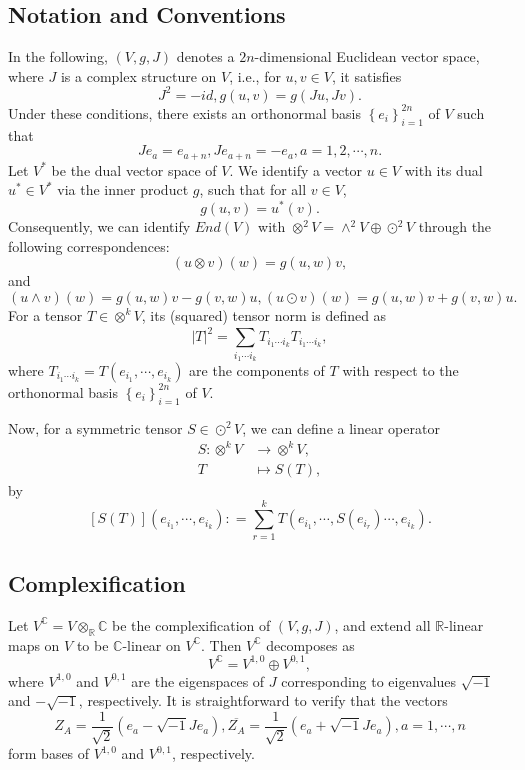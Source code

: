 \documentclass{amsart}
\theoremstyle{definition}
\theoremstyle{remark}
\numberwithin{equation}{section}
\begin{document}
\subsection{Notation and Conventions}
 In the following, $\left( V,g,J \right)$ denotes a $2n$-dimensional Euclidean vector space, where $J$ is a complex structure on $V$, i.e., for $u,v \in V$, it satisfies
$$J^2=-id,g\left( {u,v} \right) = g\left( {Ju,Jv} \right).$$
Under these conditions, there  exists an orthonormal basis $\left\{ {{e_i}} \right\}_{i = 1}^{2n}$ of $V$ such that
\begin{equation}
\label{equation2.1}
J{e_a} = {e_{a + n}},J{e_{a + n}} =  - {e_a},a = 1,2, \cdots ,n.
\end{equation}
Let $V^*$ be the dual vector space of $V$. We identify a vector $u\in V$ with its dual $u^* \in V^*$ via the inner product $g$, such that for all $v\in V$,
$$g\left( {u,v} \right)={u^*}\left( {v} \right).$$
Consequently, we can identify  $End \left( V \right)$ with ${ \otimes ^2}{V } = {\wedge} ^{2} V \oplus {\odot} ^{2} V$ through the following correspondences:
$$\left( {u \otimes v} \right)\left( {w} \right) = g\left( {u,w} \right)v,$$
and
$$\left( {u \wedge v} \right)\left( {w} \right) = g\left( {u,w} \right)v - g\left( {v,w} \right)u,  \left( {u \odot v} \right)\left( {w} \right) = g\left( {u,w} \right)v + g\left( {v,w} \right)u.$$
For a tensor $T \in \otimes ^k V$, its (squared) tensor norm is defined as
$${\left| T \right|^2} = \sum\limits_{{i_1} \cdots {i_k}}^{} {{T_{{i_1} \cdots {i_k}}}{T_{{i_1} \cdots {i_k}}}}  ,$$
where ${T_{{i_1} \cdots {i_k}}} = T\left( {{e_{{i_1}}}, \cdots ,{e_{{i_k}}}} \right)$ are the components of $T$ with respect to the orthonormal basis $\left\{ {{e_i}} \right\}_{i = 1}^{2n}$ of $V$.

Now, for a symmetric tensor $S \in {\odot} ^2 V$, we can define a linear operator
\begin{align*}
  S:{ \otimes ^k}V &\to { \otimes ^k}V, \\
    T &\mapsto S(T),
\end{align*}
by
$$\left[ {S(T)} \right]\left( {{e_{{i_1}}}, \cdots ,{e_{{i_k}}}} \right): = \sum\limits_{r = 1}^k {T\left( {{e_{{i_1}}}, \cdots ,S\left( {{e_{{i_r}}}} \right) \cdots ,{e_{{i_k}}}} \right)} .$$

\subsection{Complexification}
Let ${V^{\mathbb{C}}} = V{ \otimes _{\mathbb{R}}{\mathbb{C}}}$ be the complexification of $\left( V,g,J \right)$, and extend all $\mathbb{R}$-linear maps on $V$ to be $\mathbb{C}$-linear on  ${V^{\mathbb{C}}}$. Then ${V^{\mathbb{C}}}$ decomposes as
$${V^{\mathbb{C}}} = {V^{1,0}} \oplus {V^{0,1}},$$
where ${V^{1,0}}$ and ${V^{0,1}}$ are the eigenspaces of $J$ corresponding to eigenvalues $\sqrt { - 1} $ and $-\sqrt { - 1} $, respectively. It is straightforward to verify that the vectors
$${Z_A} = \frac{1}{{\sqrt 2 }}\left( {{e_a} - \sqrt { - 1} J{e_a}} \right),\overline {{Z_A}}  = \frac{1}{{\sqrt 2 }}\left( {{e_a} + \sqrt { - 1} J{e_a}} \right),a=1,\cdots,n$$
form bases of ${V^{1,0}} $ and $ {V^{0,1}}$, respectively.
\end{document}
